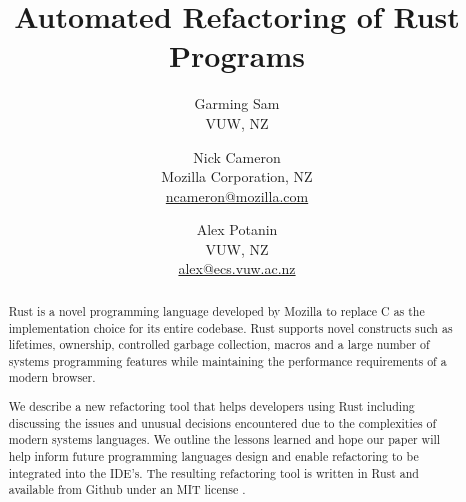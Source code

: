 \documentclass{sig-alternate-05-2015}
\begin{document}
\title{Automated Refactoring of Rust Programs}

\author{Garming Sam\\ VUW, NZ \and Nick Cameron\\ Mozilla Corporation, NZ\\ \url{ncameron@mozilla.com} \and Alex Potanin\\ VUW, NZ\\ \url{alex@ecs.vuw.ac.nz}}

\maketitle

\begin{abstract}
Rust is a novel programming language developed by Mozilla to replace C as the implementation choice for its entire codebase. Rust supports novel constructs such as lifetimes, ownership, controlled garbage collection, macros and a large number of systems programming features while maintaining the performance requirements of a modern browser.

We describe a new refactoring tool that helps developers using Rust including discussing the issues and unusual decisions encountered due to the complexities of modern systems languages. We outline the lessons learned and hope our paper will help inform future programming languages design and enable refactoring to be integrated into the IDE's. The resulting refactoring tool is written in Rust and available from Github under an MIT license \cite{rrproject}.
\end{abstract}












\end{document}
